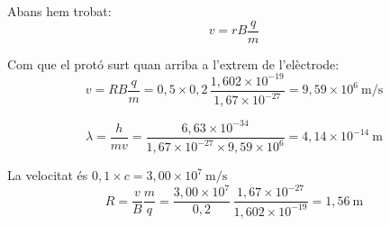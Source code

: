 \begin{solapartat}
 Abans hem trobat:
\[ v = rB\frac{q}{m} \]

Com que el protó surt quan arriba a l'extrem de l'elèctrode:
\[ v = RB\frac{q}{m} = 0,5\times 0,2\,\frac{1,602\times 10^{-19}}{1,67\times 10^{-27}} = 9,59\times 10^{6}\ \mathrm{m/s} \]

\[ \lambda = \frac{h}{mv} = \frac{6,63\times 10^{-34}}{1,67\times 10^{-27}\times 9,59\times 10^{6}} = 4,14\times 10^{-14}\ \mathrm{m} \]

 La velocitat és $0,1\times c = 3,00\times 10^{7}\ \mathrm{m/s}$
\[ R = \frac{v}{B}\frac{m}{q} = \frac{3,00\times 10^{7}}{0,2}\,\frac{1,67\times 10^{-27}}{1,602\times 10^{-19}} = 1,56\ \mathrm{m} \]
\end{solapartat}
